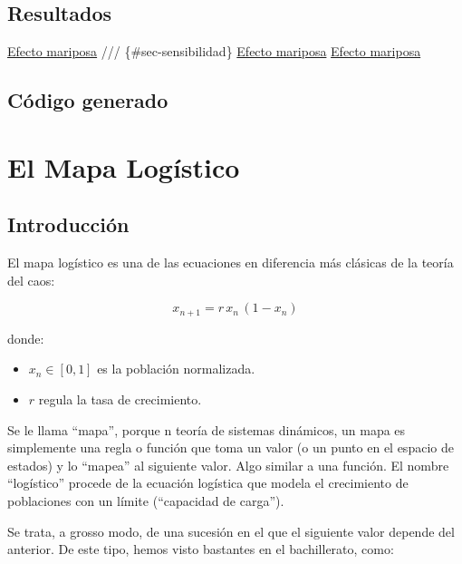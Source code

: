 \documentclass[
  10pt,
  a4paper,
  DIV=11,
  numbers=noendperiod,
  open=any]{scrreprt}
\providecommand{\tightlist}{%
  \setlength{\itemsep}{0pt}\setlength{\parskip}{0pt}}
\numberwithin{equation}{chapter}
\numberwithin{equation}{chapter}
\renewcommand{\[}{\begin{equation}}
\renewcommand{\]}{\end{equation}}
\begin{document}
\section{Resultados}\label{resultados-1}

\hyperref[sec-sensibilidad]{Efecto mariposa} /// \{\#sec-sensibilidad\}
\hyperref[sec-inestabilidad]{Efecto mariposa}
\hyperref[sec-exponente]{Efecto mariposa}

\section{Código generado}\label{cuxf3digo-generado}


\chapter{El Mapa Logístico}\label{el-mapa-loguxedstico}

\section{Introducción}\label{introducciuxf3n}

El mapa logístico es una de las ecuaciones en diferencia más clásicas de
la teoría del caos:

\begin{equation}

x_{n+1} = r\,x_n\,(1 - x_n)

\end{equation}

donde:

\begin{itemize}
\tightlist
\item
  \(x_n \in [0,1]\) es la población normalizada.
\item
  \(r\) regula la tasa de crecimiento.
\end{itemize}

Se le llama ``mapa'', porque n teoría de sistemas dinámicos, un mapa es
simplemente una regla o función que toma un valor (o un punto en el
espacio de estados) y lo ``mapea'' al siguiente valor. Algo similar a
una función. El nombre ``logístico'' procede de la ecuación logística
que modela el crecimiento de poblaciones con un límite (``capacidad de
carga'').

Se trata, a grosso modo, de una sucesión en el que el siguiente valor
depende del anterior. De este tipo, hemos visto bastantes en el
bachillerato, como:
\end{document}
